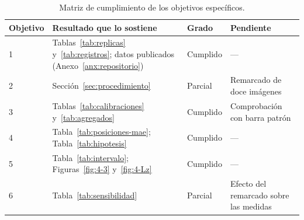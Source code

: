 
\begin{table}[htbp]
\centering\small
\caption{Matriz de cumplimiento de los objetivos específicos.}
\label{tab:cumplimiento}
\begin{tabularx}{\textwidth}{@{}p{1.6cm} X p{1.8cm} X@{}}
\toprule
Objetivo & Resultado que lo sostiene & Grado & Pendiente \\
\midrule
1 & Tablas~\ref{tab:replicas} y~\ref{tab:registros}; datos publicados (Anexo~\ref{anx:repositorio}) & Cumplido & --- \\
2 & Sección~\ref{sec:procedimiento} & Parcial & Remarcado de doce imágenes \\
3 & Tablas~\ref{tab:calibraciones} y~\ref{tab:agregados} & Cumplido & Comprobación con barra patrón \\
4 & Tabla~\ref{tab:posiciones-mae}; Tabla~\ref{tab:hipotesis} & Cumplido & --- \\
5 & Tabla~\ref{tab:intervalo}; Figuras~\ref{fig:4-3} y~\ref{fig:4-Lz} & Cumplido & --- \\
6 & Tabla~\ref{tab:sensibilidad} & Parcial & Efecto del remarcado sobre las medidas \\
\bottomrule
\end{tabularx}
\end{table}
